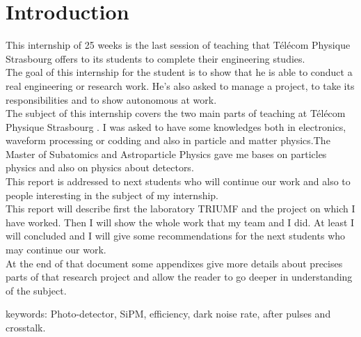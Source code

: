 \documentclass[a4paper, 11pt]{report}%
\newcommand{\TPS}{T\'el\'ecom Physique Strasbourg }
\newcommand{\TR}{TRIUMF }
\begin{document}
\thispagestyle{empty}
\listoffigures


\chapter{Introduction}


  \setcounter{page}{1}
  
  This internship of 25 weeks is the last session of teaching that \TPS offers to its students to complete their 
  engineering studies. \\
  The goal of this internship for the student is to show that he is able to conduct a real engineering or research 
  work. 
  He's also asked to manage a project, to take its responsibilities and to show autonomous at work. 
  \\

  The subject of this internship covers the two main parts of teaching at \TPS. I was asked to have some knowledges both in electronics, 
  waveform processing or codding and also in particle and matter physics.The Master of Subatomics and Astroparticle Physics gave me bases on
  particles physics and also on physics about detectors. 
  \\ 
  
  This report is addressed to next students who will continue our work and also to people interesting in the subject of my internship.\\ 
  This report will describe first the laboratory \TR and the project on which I have worked. Then I will show the whole work that my team 
  and I did. At least I will concluded and I will give some recommendations for the next students who may continue our work. 
  \\
  
  At the end of that document some appendixes give more details about precises parts of that research project and allow the reader to 
  go deeper in understanding of the subject.

  
  \vfill
  
  keywords: Photo-detector, SiPM, efficiency, dark noise rate, after pulses and crosstalk. 
\end{document}
